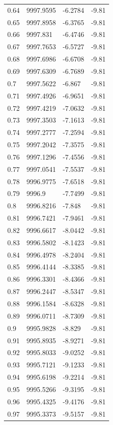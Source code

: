 \begin{table}[H]
\begin{tabular}{llll}
0.64 & 9997.9595 & -6.2784 & -9.81 \\
0.65 & 9997.8958 & -6.3765 & -9.81 \\
0.66 & 9997.831 & -6.4746 & -9.81 \\
0.67 & 9997.7653 & -6.5727 & -9.81 \\
0.68 & 9997.6986 & -6.6708 & -9.81 \\
0.69 & 9997.6309 & -6.7689 & -9.81 \\
0.7 & 9997.5622 & -6.867 & -9.81 \\
0.71 & 9997.4926 & -6.9651 & -9.81 \\
0.72 & 9997.4219 & -7.0632 & -9.81 \\
0.73 & 9997.3503 & -7.1613 & -9.81 \\
0.74 & 9997.2777 & -7.2594 & -9.81 \\
0.75 & 9997.2042 & -7.3575 & -9.81 \\
0.76 & 9997.1296 & -7.4556 & -9.81 \\
0.77 & 9997.0541 & -7.5537 & -9.81 \\
0.78 & 9996.9775 & -7.6518 & -9.81 \\
0.79 & 9996.9 & -7.7499 & -9.81 \\
0.8 & 9996.8216 & -7.848 & -9.81 \\
0.81 & 9996.7421 & -7.9461 & -9.81 \\
0.82 & 9996.6617 & -8.0442 & -9.81 \\
0.83 & 9996.5802 & -8.1423 & -9.81 \\
0.84 & 9996.4978 & -8.2404 & -9.81 \\
0.85 & 9996.4144 & -8.3385 & -9.81 \\
0.86 & 9996.3301 & -8.4366 & -9.81 \\
0.87 & 9996.2447 & -8.5347 & -9.81 \\
0.88 & 9996.1584 & -8.6328 & -9.81 \\
0.89 & 9996.0711 & -8.7309 & -9.81 \\
0.9 & 9995.9828 & -8.829 & -9.81 \\
0.91 & 9995.8935 & -8.9271 & -9.81 \\
0.92 & 9995.8033 & -9.0252 & -9.81 \\
0.93 & 9995.7121 & -9.1233 & -9.81 \\
0.94 & 9995.6198 & -9.2214 & -9.81 \\
0.95 & 9995.5266 & -9.3195 & -9.81 \\
0.96 & 9995.4325 & -9.4176 & -9.81 \\
0.97 & 9995.3373 & -9.5157 & -9.81 \\

\end{tabular}
\end{table}
